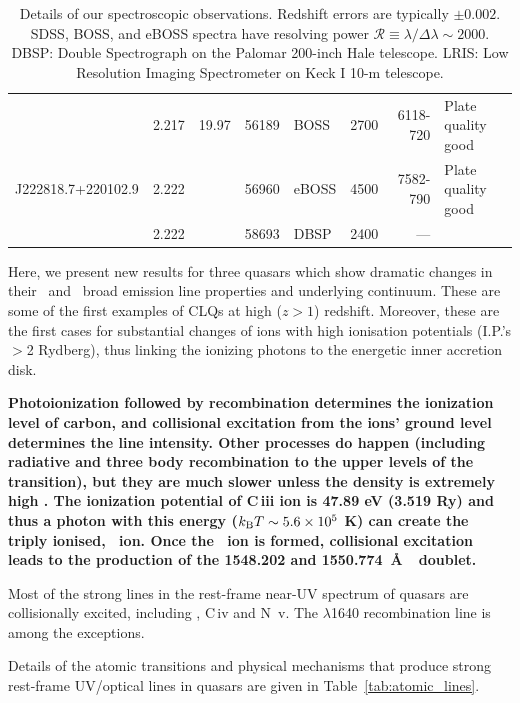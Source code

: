 \documentclass[fleqn,usenatbib]{mnras}
\begin{document}
\begin{table}
\begin{tabular}{l l   r ll  r r l}
                                      & 2.217                               & 19.97          &  56189                    &  BOSS                                    &  2700            &   6118-720          & Plate quality good \\
 J222818.7+220102.9   & 2.222                               &                    &  56960                     & eBOSS                                    &  4500            &   7582-790          & Plate quality good \\ 
                                     &  2.222                               &                    &  58693                    &  DBSP                                    & 2400             &    ---                        &    \\
    \hline \hline   
  \end{tabular}
  \caption{Details of our spectroscopic observations.  Redshift errors are
    typically $\pm 0.002$.  SDSS, BOSS, and eBOSS spectra have
    resolving power $\mathcal{R} \equiv \lambda / \Delta \lambda \sim 2000$.  DBSP: Double Spectrograph on the Palomar
    200-inch Hale telescope.  LRIS: Low Resolution Imaging Spectrometer on Keck
    I 10-m telescope.} 
  \label{tab:obs_notes}
\end{table}

Here, we present new results for three quasars which show dramatic
changes in their \civ\ and \ciii\ broad emission line properties and
underlying continuum. These are some of the first examples of CLQs at
high ($z>1$) redshift. Moreover, these are the first cases for
substantial changes of ions with high ionisation potentials (I.P.'s
$>$2 Rydberg), thus linking the ionizing photons to the energetic
inner accretion disk.

{\bf Photoionization followed by recombination determines the
ionization level of carbon, and collisional excitation from the ions'
ground level determines the line intensity. Other processes do happen
(including radiative and three body recombination to the upper levels
of the transition), but they are much slower unless the density is
extremely high \citep[e.g., ][and H. Netzer,
priv. comm.]{Dopita_Sutherland2003book}. The ionization potential of
C\,{\sc iii} ion is 47.89 eV (3.519 Ry) and thus a photon with this
energy ($k_{\rm B} T \sim 5.6 \times10^{5}$ K) can create the triply
ionised, \civ\ ion. Once the \civ\ ion is formed, collisional
excitation leads to the production of the 1548.202 and 1550.774~\AA\
\civ\ doublet.

Most of the strong lines in the rest-frame near-UV spectrum of quasars
are collisionally excited, including \ciii, C\,{\sc iv} and N\,{\sc
v}.  The \heii$\lambda$1640 recombination line is among the
exceptions.} Details of the atomic transitions and physical mechanisms
that produce strong rest-frame UV/optical lines in quasars are given
in Table~\ref{tab:atomic_lines}.
\end{document}
